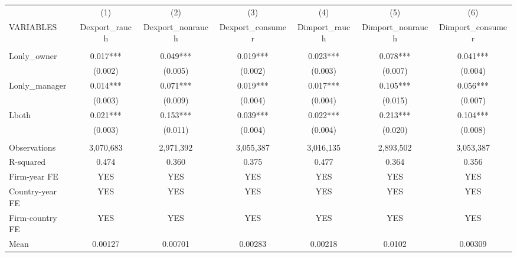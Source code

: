 \begin{tabular}{lcccccc} \hline
 & (1) & (2) & (3) & (4) & (5) & (6) \\
VARIABLES & Dexport\_rauch & Dexport\_nonrauch & Dexport\_consumer & Dimport\_rauch & Dimport\_nonrauch & Dimport\_consumer \\ \hline
 &  &  &  &  &  &  \\
Lonly\_owner & 0.017*** & 0.049*** & 0.019*** & 0.023*** & 0.078*** & 0.041*** \\
 & (0.002) & (0.005) & (0.002) & (0.003) & (0.007) & (0.004) \\
Lonly\_manager & 0.014*** & 0.071*** & 0.019*** & 0.017*** & 0.105*** & 0.056*** \\
 & (0.003) & (0.009) & (0.004) & (0.004) & (0.015) & (0.007) \\
Lboth & 0.021*** & 0.153*** & 0.039*** & 0.022*** & 0.213*** & 0.104*** \\
 & (0.003) & (0.011) & (0.004) & (0.004) & (0.020) & (0.008) \\
 &  &  &  &  &  &  \\
Observations & 3,070,683 & 2,971,392 & 3,055,387 & 3,016,135 & 2,893,502 & 3,053,387 \\
R-squared & 0.474 & 0.360 & 0.375 & 0.477 & 0.364 & 0.356 \\
Firm-year FE & YES & YES & YES & YES & YES & YES \\
Country-year FE & YES & YES & YES & YES & YES & YES \\
Firm-country FE & YES & YES & YES & YES & YES & YES \\
 Mean & 0.00127 & 0.00701 & 0.00283 & 0.00218 & 0.0102 & 0.00309 \\ \hline
\end{tabular}
